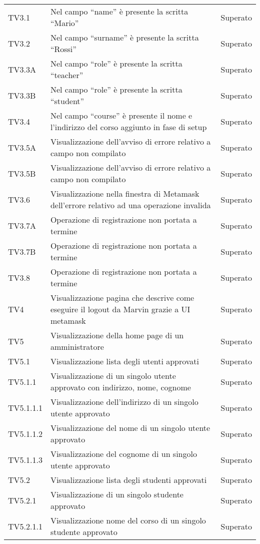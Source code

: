 \documentclass[PianoDiQualifica.tex]{subfiles}
\begin{document}
\begin{longtable}[H]{P{2cm}P{8.5cm}P{3cm}}
	TV3.1 & Nel campo “name” è presente la scritta “Mario” & Superato \\ 
	TV3.2 & Nel campo “surname” è presente la scritta “Rossi” & Superato \\ 
	TV3.3A & Nel campo “role” è presente la scritta “teacher” & Superato \\ 
	TV3.3B & Nel campo “role” è presente la scritta “student” & Superato \\ 
	TV3.4 & Nel campo “course” è presente il nome e l'indirizzo del corso aggiunto in fase di setup & Superato \\ 
	TV3.5A & Visualizzazione dell'avviso di errore relativo a campo non compilato & Superato \\ 
	TV3.5B & Visualizzazione dell'avviso di errore relativo a campo non compilato & Superato \\ 
	TV3.6 & Visualizzazione nella finestra di Metamask dell'errore relativo ad una operazione invalida & Superato \\ 
	TV3.7A & Operazione di registrazione non portata a termine & Superato \\ 
	TV3.7B & Operazione di registrazione non portata a termine & Superato \\ 
	TV3.8 & Operazione di registrazione non portata a termine & Superato \\ 
	TV4 & Visualizzazione pagina che descrive come eseguire il logout da Marvin grazie a UI metamask & Superato \\ 
	TV5 & Visualizzazione della home page di un amministratore & Superato \\ 
	TV5.1 & Visualizzazione lista degli utenti approvati & Superato \\ 
	TV5.1.1 & Visualizzazione di un singolo utente approvato con indirizzo, nome, cognome & Superato \\ 
	TV5.1.1.1 & Visualizzazione dell'indirizzo di un singolo utente approvato & Superato \\ 
	TV5.1.1.2 & Visualizzazione del nome di un singolo utente approvato & Superato \\ 
	TV5.1.1.3 & Visualizzazione del cognome di un singolo utente approvato & Superato \\ 
	TV5.2 & Visualizzazione lista degli studenti approvati & Superato \\ 
	TV5.2.1 & Visualizzazione di un singolo studente approvato & Superato \\ 
	TV5.2.1.1 & Visualizzazione nome del corso di un singolo studente approvato & Superato \\ 

\end{longtable}
\end{document}
